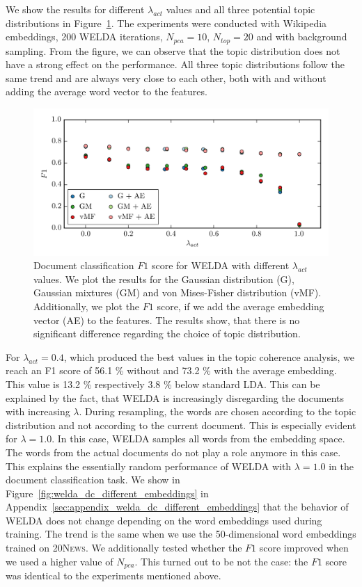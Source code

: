 \documentclass[
        a4paper,
        titlepage,
        twoside,
        parskip,
        numbers=noenddot
        ]{scrbook}
\theoremstyle{break}
\begin{document}
We show the results for different $\lambda_{act}$ values and all three potential topic distributions in Figure~\ref{fig:welda_dc}.
The experiments were conducted with Wikipedia embeddings, 200 WELDA iterations, $N_{pca} = 10$, $N_{top} = 20$ and with background sampling.
From the figure, we can observe that the topic distribution does not have a strong effect on the performance.
All three topic distributions follow the same trend and are always very close to each other, both with and without adding the average word vector to the features.
\begin{figure}
       \centering
       \includegraphics[width=14cm]{figures/welda_dc.png}
       \caption{Document classification $F1$ score for WELDA with different $\lambda_{act}$ values. We plot the results for the Gaussian distribution (G), Gaussian mixtures (GM) and von Mises-Fisher distribution (vMF). Additionally, we plot the $F1$ score, if we add the average embedding vector (AE) to the features. The results show, that there is no significant difference regarding the choice of topic distribution.}
       \label{fig:welda_dc}
\end{figure}

For $\lambda_{act} = 0.4$, which produced the best values in the topic coherence analysis, we reach an F1 score of 56.1 \% without and 73.2 \% with the average embedding.
This value is 13.2 \% respectively 3.8 \% below standard LDA.
This can be explained by the fact, that WELDA is increasingly disregarding the documents with increasing $\lambda$.
During resampling, the words are chosen according to the topic distribution and not according to the current document.
This is especially evident for $\lambda = 1.0$.
In this case, WELDA samples all words from the embedding space.
The words from the actual documents do not play a role anymore in this case.
This explains the essentially random performance of WELDA with $\lambda = 1.0$ in the document classification task.
We show in Figure~\ref{fig:welda_dc_different_embeddings} in Appendix~\ref{sec:appendix_welda_dc_different_embeddings} that the behavior of WELDA does not change depending on the word embeddings used during training.
The trend is the same when we use the 50-dimensional word embeddings trained on \textsc{20News}.
We additionally tested whether the $F1$ score improved when we used a higher value of $N_{pca}$.
This turned out to be not the case: the $F1$ score was identical to the experiments mentioned above.
\end{document}
